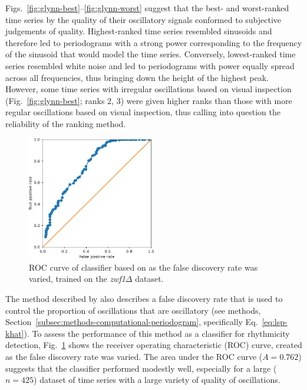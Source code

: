 Figs.\ \ref{fig:glynn-best}--\ref{fig:glynn-worst} suggest that the best- and worst-ranked time series by the quality of their oscillatory signals conformed to subjective judgements of quality.
Highest-ranked time series resembled sinusoids and therefore led to periodograms with a strong power corresponding to the frequency of the sinusoid that would model the time series.
Conversely, lowest-ranked time series resembled white noise and led to periodograms with power equally spread across all frequencies, thus bringing down the height of the highest peak.
However, some time series with irregular oscillations based on visual inspection (Fig.\ \ref{fig:glynn-best}; ranks 2, 3) were given higher ranks than those with more regular oscillations based on visual inspection, thus calling into question the reliability of the ranking method.

\begin{figure}
  \centering
  \includegraphics[width=0.5\textwidth]{glynn_is20016_5_edit.pdf}
  \caption[
    ROC curve of classifier based on \textcite{glynnDetectingPeriodicPatterns2006a}.
  ]{
    ROC curve of classifier based on \textcite{glynnDetectingPeriodicPatterns2006a} as the false discovery rate was varied, trained on the \textit{zwf1$\Delta$} dataset.
  }
  \label{fig:glynn-roc}
\end{figure}

The method described by \textcite{glynnDetectingPeriodicPatterns2006a} also describes a false discovery rate that is used to control the proportion of oscillations that are oscillatory (see methods, Section~\ref{subsec:methods-computational-periodogram}, specifically Eq.\ \ref{eq:lsp-khat}).
To assess the performance of this method as a classifier for rhythmicity detection, Fig.\ \ref{fig:glynn-roc} shows the receiver operating characteristic (ROC) curve, created as the false discovery rate was varied.
The area under the ROC curve ($A = 0.762$) suggests that the classifier performed modestly well, especially for a large ($n=425$) dataset of time series with a large variety of quality of oscillations.


